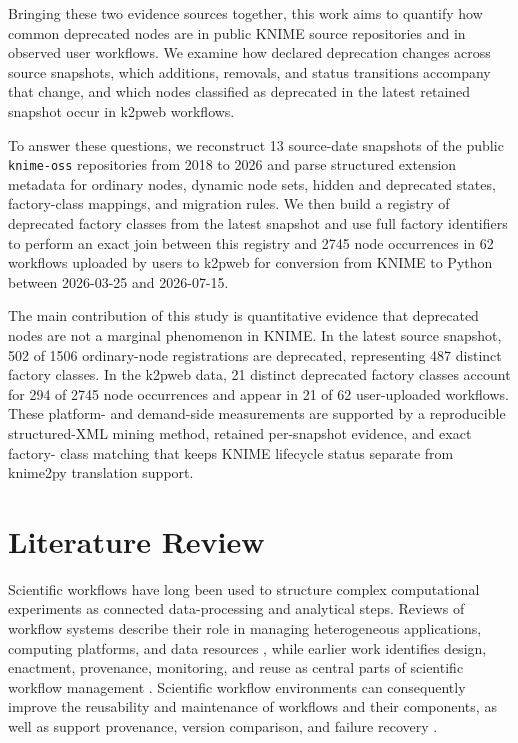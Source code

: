 \documentclass[runningheads]{llncs}
\begin{document}
Bringing these two evidence sources together, this work aims to quantify how
common deprecated nodes are in public KNIME source repositories and in observed
user workflows. We examine how declared deprecation changes across source
snapshots, which additions, removals, and status transitions accompany that
change, and which nodes classified as deprecated in the latest retained
snapshot occur in k2pweb workflows.

To answer these questions, we reconstruct 13 source-date snapshots of the
public \texttt{knime-oss} repositories from 2018 to 2026 and parse structured
extension metadata for ordinary nodes, dynamic node sets, hidden and deprecated
states, factory-class mappings, and migration rules. We then build a registry
of deprecated factory classes from the latest snapshot and use full factory
identifiers to perform an exact join between this registry and 2745 node
occurrences in 62 workflows uploaded by users to k2pweb for conversion from
KNIME to Python between 2026-03-25 and 2026-07-15.

The main contribution of this study is quantitative evidence that deprecated nodes are not a
marginal phenomenon in KNIME. In the latest source snapshot, 502 of 1506
ordinary-node registrations are deprecated, representing 487 distinct factory
classes. In the k2pweb data, 21 distinct deprecated factory classes account for
294 of 2745 node occurrences and appear in 21 of 62 user-uploaded workflows.
These platform- and demand-side measurements are supported by a reproducible
structured-XML mining method, retained per-snapshot evidence, and exact factory-
class matching that keeps KNIME lifecycle status separate from knime2py
translation support.

\section{Literature Review}

Scientific workflows have long been used to structure complex computational
experiments as connected data-processing and analytical steps. Reviews of
workflow systems describe their role in managing heterogeneous applications,
computing platforms, and data resources \cite{Liew2017Workflows}, while earlier
work identifies design, enactment, provenance, monitoring, and reuse as central
parts of scientific workflow management \cite{Ludascher2009Automation}.
Scientific workflow environments can consequently improve the reusability and
maintenance of workflows and their components, as well as support provenance,
version comparison, and failure recovery \cite{Altintas2006Accelerating}.
\end{document}
